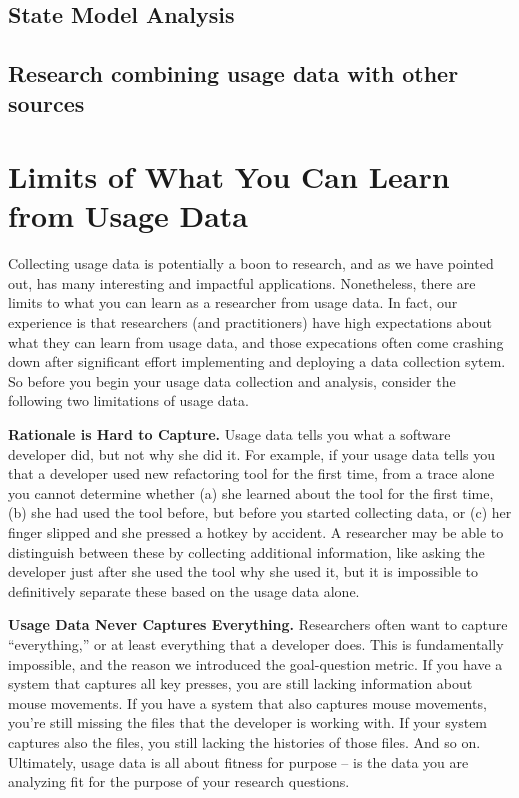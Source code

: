 \subsection{State Model Analysis}


\subsection{Research combining usage data with other sources}



\section{Limits of What You Can Learn from Usage Data}\label{sec:limitations}

Collecting usage data is potentially a boon to research, and as we have
pointed out, has many interesting and impactful applications.
Nonetheless, there are limits to what you can learn as a researcher
from usage data.
In fact, our experience is that researchers (and practitioners) have 
high expectations about what they can learn from usage data, and those
expecations often come crashing down after significant effort implementing
and deploying a data collection sytem.
So before you begin your usage data collection and analysis, consider
the following two limitations of usage data.

\textbf{Rationale is Hard to Capture.}
Usage data tells you what a software developer did, but not
why she did it.
For example, if your usage data tells you that a developer used 
new refactoring tool for the first time, from a trace alone you cannot determine whether
(a) she learned about the tool for the first time, (b) she had used the tool before,
but before you started collecting data, or (c) her finger slipped and 
she pressed a hotkey by accident.
A researcher may be able to distinguish between these by collecting additional information,
like asking the developer just after she used the tool why she used it,
but it is impossible to definitively separate these based on the 
usage data alone.

\textbf{Usage Data Never Captures Everything.}
Researchers often want to capture ``everything,'' or at least 
everything that a developer does.
This is fundamentally impossible, and the reason we introduced the 
goal-question metric.
If you have a system that captures all key presses, you are still 
lacking information about mouse movements.
If you have a system that also captures mouse movements, you're still
missing the files that the developer is working with.
If your system captures also the files, you still lacking the 
histories of those files.
And so on.
Ultimately, usage data is all about fitness for purpose -- is the data
you are analyzing fit for the purpose of your research questions.

